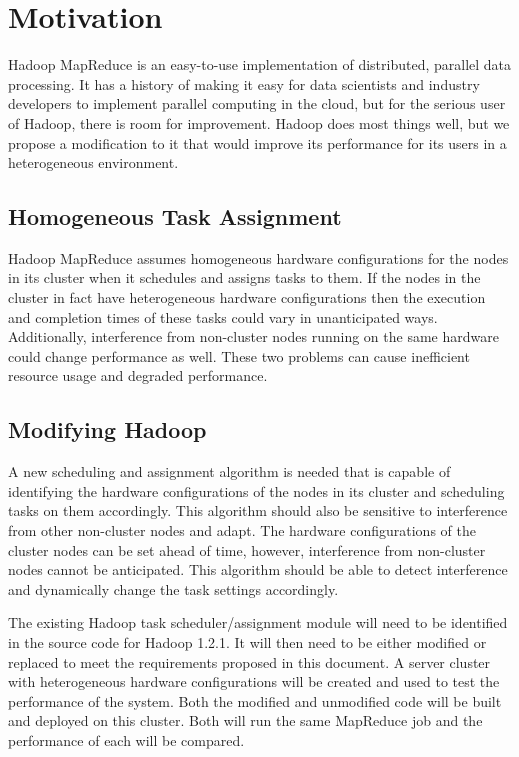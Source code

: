 \section{Motivation}
\label{section:motivation}
Hadoop MapReduce is an easy-to-use implementation of distributed, parallel data 
processing. It has a history of making it easy for data scientists and industry 
developers to implement parallel computing in the cloud, but for the serious 
user of Hadoop, there is room for improvement. Hadoop does most things well, 
but we propose a modification to it that would improve its performance for its
users in a heterogeneous environment.

\subsection{Homogeneous Task Assignment}
Hadoop MapReduce assumes homogeneous hardware configurations for the nodes in 
its cluster when it schedules and assigns tasks to them. If the nodes in the 
cluster in fact have heterogeneous hardware configurations then the execution 
and completion times of these tasks could vary in unanticipated ways. 
Additionally, interference from non-cluster nodes running on the same hardware 
could change performance as well. These two problems can cause inefficient 
resource usage and degraded performance. 

\subsection{Modifying Hadoop}
A new scheduling and assignment algorithm is needed that is capable of 
identifying the hardware configurations of the nodes in its cluster and 
scheduling tasks on them accordingly. This algorithm should also be sensitive 
to interference from other non-cluster nodes and adapt. The hardware 
configurations of the cluster nodes can be set ahead of time, however, 
interference from non-cluster nodes cannot be anticipated. This algorithm 
should be able to detect interference and dynamically change the task settings 
accordingly.

The existing Hadoop task scheduler/assignment module will need to be identified 
in the source code for Hadoop 1.2.1. It will then need to be either modified or 
replaced to meet the requirements proposed in this document. A server cluster 
with heterogeneous hardware configurations will be created and used to test the 
performance of the system. Both the modified and unmodified code will be built 
and deployed on this cluster. Both will run the same MapReduce job and the 
performance of each will be compared.
